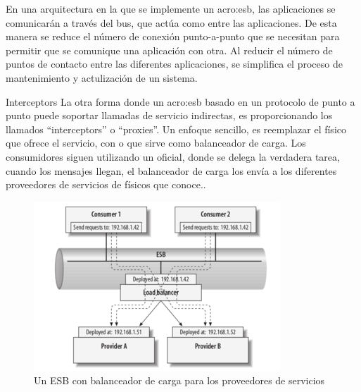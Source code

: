
En una arquitectura en la que se implemente un \gls{acro:esb}, las aplicaciones se comunicarán a través del bus, que actúa como  entre las aplicaciones. De esta manera se reduce el número de conexión punto-a-punto que se necesitan para permitir que se comunique una aplicación con otra.  Al reducir el número de puntos de contacto entre las diferentes aplicaciones, se simplifica el proceso de mantenimiento y actulización de un sistema.


Interceptors
La otra forma donde un \gls{acro:esb} basado en un protocolo de punto a punto puede soportar llamadas de servicio indirectas, es proporcionando los llamados ``interceptors'' o ``proxies''. Un enfoque sencillo, es reemplazar el  físico que ofrece el servicio, con  o  que sirve como balanceador de carga. Los consumidores siguen utilizando un  oficial, donde se delega la verdadera tarea, cuando los mensajes llegan, el balanceador de carga los envía a los diferentes proveedores de servicios de físicos que conoce.\cite[p.~52]{josuttis2007}.

\begin{figure}[H]
  \includegraphics[width=\linewidth]{src/images/02-capitulo-2/tecnologias/esb/esb-interceptors-load-balancer.png}
  \caption{Un ESB con balanceador de carga para los proveedores de servicios}
  \label{fig:esb-interceptors-load-balancer}
\end{figure}
